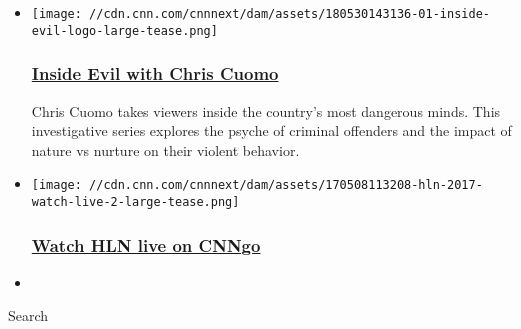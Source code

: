 \begin{itemize}
\item
  \href{/shows/inside-evil}{}

  \texttt{[image: //cdn.cnn.com/cnnnext/dam/assets/180530143136-01-inside-evil-logo-large-tease.png]}

  \hypertarget{inside-evil-with-chris-cuomo}{%
  \subsubsection{\texorpdfstring{\href{/shows/inside-evil}{Inside Evil
  with Chris
  Cuomo}}{Inside Evil with Chris Cuomo}}\label{inside-evil-with-chris-cuomo}}

  Chris Cuomo takes viewers inside the country's most dangerous minds.
  This investigative series explores the psyche of criminal offenders
  and the impact of nature vs nurture on their violent behavior.
\end{itemize}

\begin{itemize}
\item
  \href{http://go.cnn.com/?stream=hln}{}

  \texttt{[image: //cdn.cnn.com/cnnnext/dam/assets/170508113208-hln-2017-watch-live-2-large-tease.png]}

  \hypertarget{watch-hln-live-on-cnngo}{%
  \subsubsection{\texorpdfstring{\href{http://go.cnn.com/?stream=hln}{Watch
  HLN live on
  CNNgo}}{Watch HLN live on CNNgo}}\label{watch-hln-live-on-cnngo}}
\end{itemize}

\begin{itemize}
\item
\end{itemize}

Search

